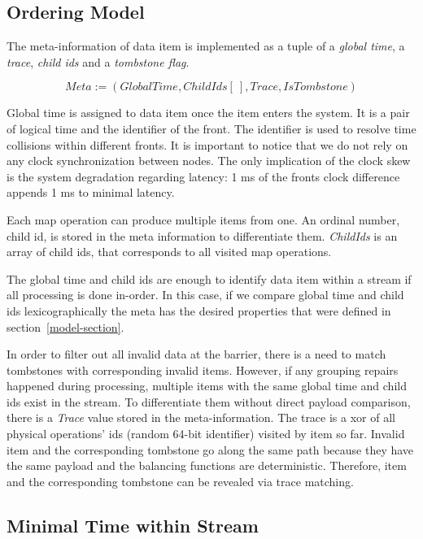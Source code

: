 \subsection{Ordering Model}
The meta-information of data item is implemented as a tuple of a {\it global time}, a {\it trace}, {\it child ids} and a {\it tombstone flag}.

\[Meta := (GlobalTime, ChildIds[\:], Trace, IsTombstone)\]

Global time is assigned to data item once the item enters the system. It is a pair of logical time and the identifier of the front. The identifier is used to resolve time collisions within different fronts. It is important to notice that we do not rely on any clock synchronization between nodes. The only implication of the clock skew is the system degradation regarding latency: 1 ms of the fronts clock difference appends 1 ms to minimal latency.

Each map operation can produce multiple items from one.  An ordinal number, child id, is stored in the meta information to differentiate them. {\it ChildIds} is an array of child ids, that corresponds to all visited map operations.

The global time and child ids are enough to identify data item within a stream if all processing is done in-order. In this case, if we compare global time and child ids lexicographically the meta has the desired properties that were defined in section~\ref{model-section}. 

In order to filter out all invalid data at the barrier, there is a need to match tombstones with corresponding invalid items. However, if any grouping repairs happened during processing, multiple items with the same global time and child ids exist in the stream. To differentiate them without direct payload comparison, there is a {\it Trace} value stored in the meta-information. The trace is a xor of all physical operations' ids (random 64-bit identifier) visited by item so far. Invalid item and the corresponding tombstone go along the same path because they have the same payload and the balancing functions are deterministic. Therefore, item and the corresponding tombstone can be revealed via trace matching. 

\label{mininal-time}

\subsection{Minimal Time within Stream}

